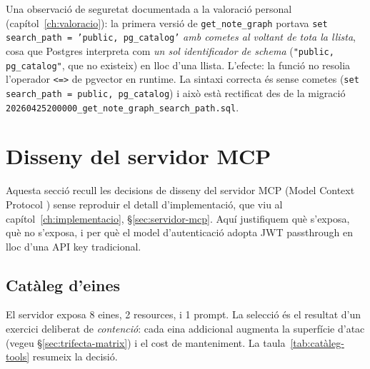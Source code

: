 Una observació de seguretat documentada a la valoració personal (capítol~\ref{ch:valoracio}): la primera versió de \texttt{get\_note\_graph} portava \texttt{set search\_path = 'public, pg\_catalog'} \emph{amb cometes al voltant de tota la llista}, cosa que Postgres interpreta com \emph{un sol identificador de schema} (\texttt{"public, pg\_catalog"}, que no existeix) en lloc d'una llista. L'efecte: la funció no resolia l'operador \texttt{<=>} de pgvector en runtime. La sintaxi correcta és sense cometes (\texttt{set search\_path = public, pg\_catalog}) i això està rectificat des de la migració \texttt{20260425200000\_get\_note\_graph\_search\_path.sql}.

\section{Disseny del servidor MCP}
\label{sec:disseny-mcp}

Aquesta secció recull les decisions de disseny del servidor MCP (Model Context Protocol \parencite{anthropic2024mcp}) sense reproduir el detall d'implementació, que viu al capítol~\ref{ch:implementacio}, \S\ref{sec:servidor-mcp}. Aquí justifiquem què s'exposa, què no s'exposa, i per què el model d'autenticació adopta JWT passthrough en lloc d'una API key tradicional.

\subsection{Catàleg d'eines}

El servidor exposa 8 eines, 2 resources, i 1 prompt. La selecció és el resultat d'un exercici deliberat de \emph{contenció}: cada eina addicional augmenta la superfície d'atac (vegeu \S\ref{sec:trifecta-matrix}) i el cost de manteniment. La taula~\ref{tab:catàleg-tools} resumeix la decisió.

